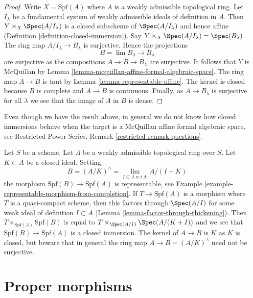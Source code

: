 \begin{proof}
Write $X = \text{Spf}(A)$ where $A$ is a weakly admissible topological ring.
Let $I_\lambda$ be a fundamental system of weakly admissible ideals
of definition in $A$. Then $Y \times_X \Spec(A/I_\lambda)$ is
a closed subscheme of $\Spec(A/I_\lambda)$
and hence affine (Definition \ref{definition-closed-immersion}).
Say $Y \times_X \Spec(A/I_\lambda) = \Spec(B_\lambda)$.
The ring map $A/I_\lambda \to B_\lambda$
is surjective. Hence the projections
$$
B = \lim B_\lambda \longrightarrow B_\lambda
$$
are surjective as the compositions $A \to B \to B_\lambda$ are surjective.
It follows that $Y$ is McQuillan by
Lemma \ref{lemma-mcquillan-affine-formal-algebraic-space}.
The ring map $A \to B$ is taut by Lemma \ref{lemma-representable-affine}.
The kernel is closed because $B$ is complete and $A \to B$ is
continuous. Finally, as $A \to B_\lambda$ is surjective for all $\lambda$
we see that the image of $A$ in $B$ is dense.
\end{proof}

\noindent
Even though we have the result above, in general we do not know how
closed immersions behave when the target is a
McQuillan affine formal algebraic space, see Restricted Power Series,
Remark \ref{restricted-remark-questions}.

\begin{example}
\label{example-closed-immersion-from-quotient}
Let $S$ be a scheme. Let $A$ be a weakly admissible topological ring over $S$.
Let $K \subset A$ be a closed ideal. Setting
$$
B = (A/K)^\wedge = \lim_{I \subset A\ w.i.d.} A/(I + K)
$$
the morphism $\text{Spf}(B) \to \text{Spf}(A)$ is representable, see
Example \ref{example-representable-morphism-from-completion}.
If $T \to \text{Spf}(A)$ is a morphism where $T$ is a quasi-compact
scheme, then this factors through $\Spec(A/I)$ for some weak
ideal of definition $I \subset A$ (Lemma \ref{lemma-factor-through-thickening}).
Then $T \times_{\text{Spf}(A)} \text{Spf}(B)$
is equal to $T \times_{\Spec(A/I)} \Spec(A/(K + I))$ and
we see that $\text{Spf}(B) \to \text{Spf}(A)$ is a closed immersion.
The kernel of $A \to B$ is $K$ as $K$ is closed, but
beware that in general the ring map $A \to B = (A/K)^\wedge$
need not be surjective.
\end{example}





\section{Proper morphisms}
\label{section-proper}

